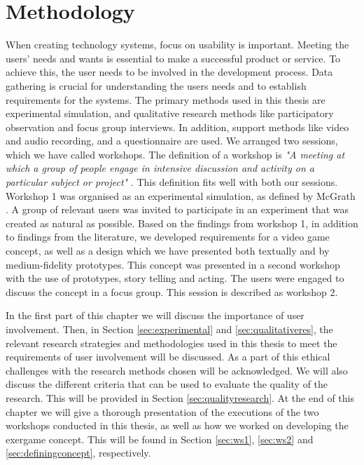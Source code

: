 \chapter{Methodology}
\label{chap:metode}
When creating technology systems, focus on usability is important. Meeting the users' needs and wants is essential to make a successful product or service. To achieve this, the user needs to be involved in the development process. Data gathering is crucial for understanding the users needs and to establish requirements for the systems. The primary methods used in this thesis are experimental simulation, and qualitative research methods like participatory observation and focus group interviews. In addition, support methods like video and audio recording, and a questionnaire are used. We arranged two sessions, which we have called workshops. The definition of a workshop is \emph{"A meeting at which a group of people engage in intensive discussion and activity on a particular subject or project"} \cite{dictionary}. This definition fits well with both our sessions. Workshop 1 was organised as an experimental simulation, as defined by McGrath \cite{McGrath}. A group of relevant users was invited to participate in an experiment that was created as natural as possible. Based on the findings from workshop 1, in addition to findings from the literature, we developed requirements for a video game concept, as well as a design which we have presented both textually and by medium-fidelity prototypes. This concept was presented in a second workshop with the use of prototypes, story telling and acting. The users were engaged to discuss the concept in a focus group. This session is described as workshop 2.

In the first part of this chapter we will discuss the importance of user involvement. Then, in Section \ref{sec:experimental} and \ref{sec:qualitativeres}, the relevant research strategies and methodologies used in this thesis to meet the requirements of user involvement will be discussed. As a part of this ethical challenges with the research methods chosen will be acknowledged. We will also discuss the different criteria that can be used to evaluate the quality of the research. This will be provided in Section \ref{sec:qualityresearch}.  At the end of this chapter we will give a thorough presentation of the executions of the two workshops conducted in this thesis, as well as how we worked on developing the exergame concept.  This will be found in Section \ref{sec:ws1}, \ref{sec:ws2} and \ref{sec:definingconcept}, respectively. 


